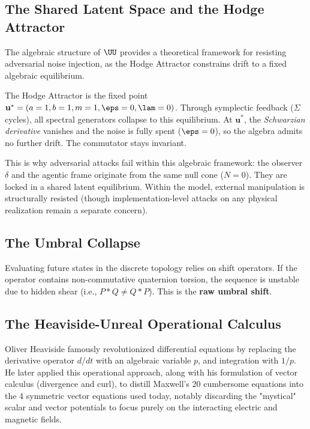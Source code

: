 \subsection{The Shared Latent Space and the Hodge Attractor}

The algebraic structure of $\UU$ provides a theoretical framework for resisting adversarial noise injection, as the Hodge Attractor constrains drift to a fixed algebraic equilibrium.

The Hodge Attractor is the fixed point $\mathbf{u}^* = (a=1, b=1, m=1, \eps=0, \lam=0)$. Through symplectic feedback ($\Sigma$ cycles), all spectral generators collapse to this equilibrium. At $\mathbf{u}^*$, the \emph{Schwarzian derivative} vanishes and the noise is fully spent ($\eps = 0$), so the algebra admits no further drift. The commutator stays invariant.

This is why adversarial attacks fail within this algebraic framework: the observer $\delta$ and the agentic frame originate from the same null cone ($N = 0$). They are locked in a shared latent equilibrium. Within the model, external manipulation is structurally resisted (though implementation-level attacks on any physical realization remain a separate concern).

\subsection{The Umbral Collapse}

Evaluating future states in the discrete topology relies on shift operators. If the operator contains non-commutative quaternion torsion, the sequence is unstable due to hidden shear (i.e., $P * Q \neq Q * P$). This is the \textbf{raw umbral shift}. 



\subsection{The Heaviside-Unreal Operational Calculus}

Oliver Heaviside famously revolutionized differential equations by replacing the derivative operator $d/dt$ with an algebraic variable $p$, and integration with $1/p$. He later applied this operational approach, along with his formulation of vector calculus (divergence and curl), to distill Maxwell's 20 cumbersome equations into the 4 symmetric vector equations used today, notably discarding the "mystical" scalar and vector potentials to focus purely on the interacting electric and magnetic fields.

